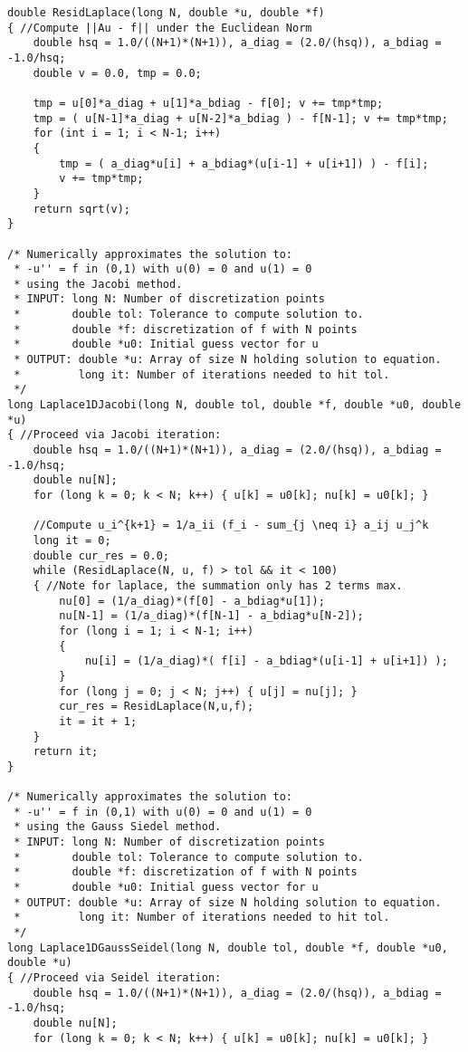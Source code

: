 \documentclass[12pt]{article}
\begin{document}
\begin{verbatim}
double ResidLaplace(long N, double *u, double *f)
{ //Compute ||Au - f|| under the Euclidean Norm
    double hsq = 1.0/((N+1)*(N+1)), a_diag = (2.0/(hsq)), a_bdiag = -1.0/hsq;
    double v = 0.0, tmp = 0.0;

    tmp = u[0]*a_diag + u[1]*a_bdiag - f[0]; v += tmp*tmp;
    tmp = ( u[N-1]*a_diag + u[N-2]*a_bdiag ) - f[N-1]; v += tmp*tmp;
    for (int i = 1; i < N-1; i++)
    {
        tmp = ( a_diag*u[i] + a_bdiag*(u[i-1] + u[i+1]) ) - f[i]; 
        v += tmp*tmp;
    }
    return sqrt(v);
}

/* Numerically approximates the solution to:
 * -u'' = f in (0,1) with u(0) = 0 and u(1) = 0
 * using the Jacobi method.
 * INPUT: long N: Number of discretization points
 *        double tol: Tolerance to compute solution to.
 *        double *f: discretization of f with N points
 *        double *u0: Initial guess vector for u
 * OUTPUT: double *u: Array of size N holding solution to equation.
 *         long it: Number of iterations needed to hit tol.
 */
long Laplace1DJacobi(long N, double tol, double *f, double *u0, double *u)
{ //Proceed via Jacobi iteration: 
    double hsq = 1.0/((N+1)*(N+1)), a_diag = (2.0/(hsq)), a_bdiag = -1.0/hsq;
    double nu[N];
    for (long k = 0; k < N; k++) { u[k] = u0[k]; nu[k] = u0[k]; }

    //Compute u_i^{k+1} = 1/a_ii (f_i - sum_{j \neq i} a_ij u_j^k
    long it = 0;
    double cur_res = 0.0;
    while (ResidLaplace(N, u, f) > tol && it < 100)
    { //Note for laplace, the summation only has 2 terms max.
        nu[0] = (1/a_diag)*(f[0] - a_bdiag*u[1]);
        nu[N-1] = (1/a_diag)*(f[N-1] - a_bdiag*u[N-2]);
        for (long i = 1; i < N-1; i++)
        {
            nu[i] = (1/a_diag)*( f[i] - a_bdiag*(u[i-1] + u[i+1]) );
        }
        for (long j = 0; j < N; j++) { u[j] = nu[j]; }
        cur_res = ResidLaplace(N,u,f);
        it = it + 1;
    }
    return it;
}

/* Numerically approximates the solution to:
 * -u'' = f in (0,1) with u(0) = 0 and u(1) = 0
 * using the Gauss Siedel method.
 * INPUT: long N: Number of discretization points
 *        double tol: Tolerance to compute solution to.
 *        double *f: discretization of f with N points
 *        double *u0: Initial guess vector for u
 * OUTPUT: double *u: Array of size N holding solution to equation.
 *         long it: Number of iterations needed to hit tol.
 */
long Laplace1DGaussSeidel(long N, double tol, double *f, double *u0, double *u)
{ //Proceed via Seidel iteration: 
    double hsq = 1.0/((N+1)*(N+1)), a_diag = (2.0/(hsq)), a_bdiag = -1.0/hsq;
    double nu[N];
    for (long k = 0; k < N; k++) { u[k] = u0[k]; nu[k] = u0[k]; }


\end{verbatim}
\end{document}
